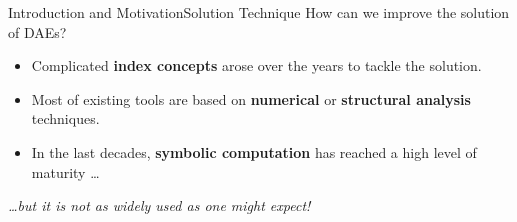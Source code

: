 \begin{frame}{Introduction and Motivation}{Solution Technique}
  How can we improve the solution of \acp{DAE}?
  \begin{itemize}
    \item Complicated \textbf{index concepts} arose over the years to tackle the solution.
    \item Most of existing tools are based on \textbf{numerical} or \textbf{structural analysis} techniques.
    \item In the last decades, \textbf{symbolic computation} has reached a high level of maturity \dots \\
  \end{itemize}
  \vspace{1.0em}
  \centering\emph{\dots but it is not as widely used as one might expect!}
  \vspace{1.0em}
\end{frame}

